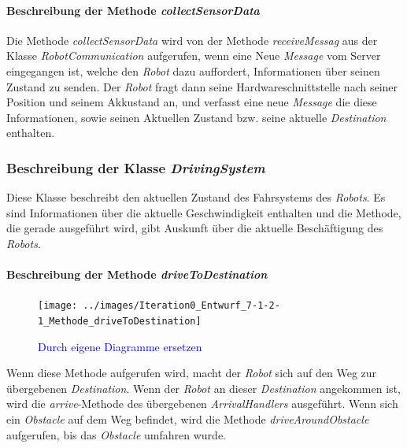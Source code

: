 			\paragraph{Beschreibung der Methode \textit{collectSensorData}}
			Die Methode \textit{collectSensorData} wird von der Methode \textit{receiveMessag} 
			aus der Klasse \textit{RobotCommunication} aufgerufen, wenn eine Neue \textit{Message} 
			vom Server eingegangen ist, welche den \textit{Robot} dazu auffordert, Informationen 
			über seinen Zustand zu senden. Der \textit{Robot} fragt dann seine Hardwareschnittstelle 
			nach seiner Position und seinem Akkustand an, und verfasst eine neue \textit{Message} 
			die diese Informationen, sowie seinen Aktuellen Zustand bzw. seine aktuelle \textit{Destination} enthalten.

	\subsubsection{Beschreibung der Klasse \textit{DrivingSystem}}
		
		Diese Klasse beschreibt den aktuellen Zustand des Fahrsystems des \textit{Robots}. 
		Es sind Informationen über die aktuelle Geschwindigkeit enthalten und die Methode, 
		die gerade ausgeführt wird, gibt Auskunft über die aktuelle Beschäftigung des \textit{Robots}.

			\paragraph{Beschreibung der Methode \textit{driveToDestination}}
			\begin{figure}[H]
			\centering
			\texttt{[image: ../images/Iteration0\_Entwurf\_7-1-2-1\_Methode\_driveToDestination]}
			\caption{\textcolor{blue}{Durch eigene Diagramme ersetzen}}
			\label{BeschreibungKlasse1}
			\end{figure}

			Wenn diese Methode aufgerufen wird, macht der \textit{Robot} sich auf den Weg zur 
			übergebenen \textit{Destination}. Wenn der \textit{Robot} an dieser \textit{Destination} 
			angekommen ist, wird die \textit{arrive}-Methode des übergebenen \textit{ArrivalHandlers} ausgeführt. 
			Wenn sich ein \textit{Obstacle} auf dem Weg befindet, wird die Methode \textit{driveAroundObstacle} 
			aufgerufen, bis das \textit{Obstacle} umfahren wurde.

